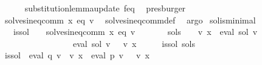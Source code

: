 \begin{isabellebody}
\ \ \ \ \isamarkupfalse%
\ substitution{\isacharunderscore}{\kern0pt}lemma{\isacharunderscore}{\kern0pt}update{\isacharbrackleft}{\kern0pt}\ f{\isacharequal}{\kern0pt}eq{\isacharbrackright}{\kern0pt}\ \isamarkupfalse%
\ presburger\isanewline
\ \ \isamarkupfalse%
\ {\isacharasterisk}{\kern0pt}\ \isamarkupfalse%
\ {\isachardoublequoteopen}solves{\isacharunderscore}{\kern0pt}ineq{\isacharunderscore}{\kern0pt}comm\ x\ eq\ v{\isachardoublequoteclose}\ \isamarkupfalse%
\ solves{\isacharunderscore}{\kern0pt}ineq{\isacharunderscore}{\kern0pt}comm{\isacharunderscore}{\kern0pt}def\ \isamarkupfalse%
\ argo\isanewline
{}\isamarkupfalse%
%
\endisatagproof
{\isafoldproof}%
%
\isadelimproof
\isanewline
%
\endisadelimproof
\isanewline
{}\isamarkupfalse%
\ sol{\isacharunderscore}{\kern0pt}is{\isacharunderscore}{\kern0pt}minimal{\isacharcolon}{\kern0pt}\isanewline
\ \ \ is{\isacharunderscore}{\kern0pt}sol{\isacharcolon}{\kern0pt}\ \ \ \ {\isachardoublequoteopen}solves{\isacharunderscore}{\kern0pt}ineq{\isacharunderscore}{\kern0pt}comm\ x\ eq\ v{\isachardoublequoteclose}\isanewline
\ \ \ \ \ \ \ sol{\isacharprime}{\kern0pt}{\isacharunderscore}{\kern0pt}s{\isacharcolon}{\kern0pt}\ \ \ \ {\isachardoublequoteopen}v\ x\ {\isacharequal}{\kern0pt}\ eval\ sol{\isacharprime}{\kern0pt}\ v{\isachardoublequoteclose}\isanewline
\ \ \ \ \ \ \ \ \ \ \ \ \ \ \ \ {\isachardoublequoteopen}{\isasymPsi}\ {\isacharparenleft}{\kern0pt}eval\ sol\ v{\isacharparenright}{\kern0pt}\ {\isasymsubseteq}\ {\isasymPsi}\ {\isacharparenleft}{\kern0pt}v\ x{\isacharparenright}{\kern0pt}{\isachardoublequoteclose}\isanewline
%
\isadelimproof
%
\endisadelimproof
%
\isatagproof
{}\isamarkupfalse%
\ {\isacharminus}{\kern0pt}\isanewline
\ \ \isamarkupfalse%
\ is{\isacharunderscore}{\kern0pt}sol\ sol{\isacharprime}{\kern0pt}{\isacharunderscore}{\kern0pt}s\ \isamarkupfalse%
\ is{\isacharunderscore}{\kern0pt}sol{\isacharprime}{\kern0pt}{\isacharcolon}{\kern0pt}\ {\isachardoublequoteopen}{\isasymPsi}\ {\isacharparenleft}{\kern0pt}eval\ q\ v\ {\isacharat}{\kern0pt}{\isacharat}{\kern0pt}\ v\ x\ {\isasymunion}\ eval\ p\ v{\isacharparenright}{\kern0pt}\ {\isasymsubseteq}\ {\isasymPsi}\ {\isacharparenleft}{\kern0pt}v\ x{\isacharparenright}{\kern0pt}{\isachardoublequoteclose}\isanewline
\ \ \ \ \isamarkupfalse%

\end{isabellebody}
